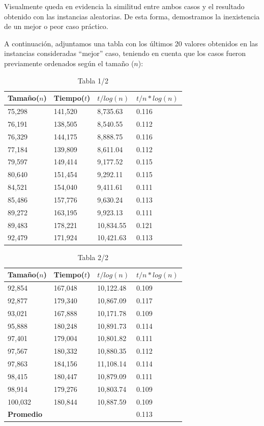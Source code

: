 Visualmente queda en evidencia la similitud entre ambos casos y el resultado obtenido con las instancias aleatorias. De esta forma, demostramos la inexistencia de un mejor o peor caso práctico.

A continuación, adjuntamos una tabla con los últimos 20 valores obtenidos en las instancias consideradas ``mejor''  caso, teniendo en cuenta que los casos fueron previamente ordenados según el tamaño ($n$):

\begin{table}[H]
\parbox{0.3\textwidth}{
    \begin{tabular}{ | l | l |l | l |}
    \hline
	Tamaño($n$) & Tiempo($t$) & \textbf{$t / log(n)$} & \textbf{$t / n*log(n)$} \\ \hline
75,298	&	141,520	&	8,735.63	&	0.116	\\ \hline
76,191	&	138,505	&	8,540.55	&	0.112	\\ \hline
76,329	&	144,175	&	8,888.75	&	0.116	\\ \hline
77,184	&	139,809	&	8,611.04	&	0.112	\\ \hline
79,597	&	149,414	&	9,177.52	&	0.115	\\ \hline
80,640	&	151,454	&	9,292.11	&	0.115	\\ \hline
84,521	&	154,040	&	9,411.61	&	0.111	\\ \hline
85,486	&	157,776	&	9,630.24	&	0.113	\\ \hline
89,272	&	163,195	&	9,923.13	&	0.111	\\ \hline
89,483	&	178,221	&	10,834.55	&	0.121	\\ \hline
92,479	&	171,924	&	10,421.63	&	0.113	\\ \hline
    \end{tabular}
  \caption*{Tabla 1/2}
}
\end{table}
\begin{table}[H]
\parbox{0.3\textwidth}{
    \begin{tabular}{ | l | l |l | l |}
    \hline
	Tamaño($n$) & Tiempo($t$) & \textbf{$t / log(n)$} & \textbf{$t / n*log(n)$} \\ \hline

92,854	&	167,048	&	10,122.48	&	0.109	\\ \hline
92,877	&	179,340	&	10,867.09	&	0.117	\\ \hline
93,021	&	167,888	&	10,171.78	&	0.109	\\ \hline
95,888	&	180,248	&	10,891.73	&	0.114	\\ \hline
97,401	&	179,004	&	10,801.82	&	0.111	\\ \hline
97,567	&	180,332	&	10,880.35	&	0.112	\\ \hline
97,863	&	184,156	&	11,108.14	&	0.114	\\ \hline
98,415	&	180,447	&	10,879.09	&	0.111	\\ \hline
98,914	&	179,276	&	10,803.74	&	0.109	\\ \hline
100,032	&	180,844	&	10,887.59	&	0.109	\\ \hline
    \textbf{Promedio} & & & 0.113 \\ \hline

    \end{tabular}
  \caption*{Tabla 2/2}
}
\end{table}
